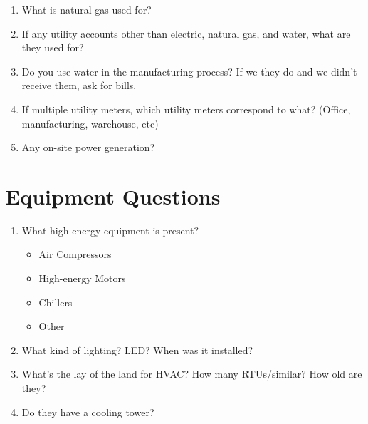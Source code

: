 \documentclass[./main.tex]{subfiles}
\begin{document}
\begin{enumerate}[leftmargin=*]
\item What is natural gas used for?

\vspace{\answerspace}

\item If any utility accounts other than electric, natural gas, and water, what are they used for? 

\vspace{\answerspace}

\item Do you use water in the manufacturing process? If we they do and we didn't receive them, ask for bills. 

\vspace{\answerspace}

\item If multiple utility meters, which utility meters correspond to what? (Office, manufacturing, warehouse, etc)

\vspace{\answerspace}

\item Any on-site power generation?

\vspace{\answerspace}
\end{enumerate}

\section*{Equipment Questions}

\begin{enumerate}[leftmargin=*]
\item What high-energy equipment is present? 

\begin{itemize}
    \item Air Compressors \vspace{\answerspace}
    \item High-energy Motors \vspace{\answerspace}
    \item Chillers \vspace{\answerspace}
    \item Other \vspace{\answerspace}
\end{itemize}

\item What kind of lighting? LED? When was it installed?

\vspace{\answerspace}

\item What's the lay of the land for HVAC? How many RTUs/similar? How old are they? 

\vspace{\answerspace}

\item Do they have a cooling tower? 

\end{enumerate}
\end{document}
